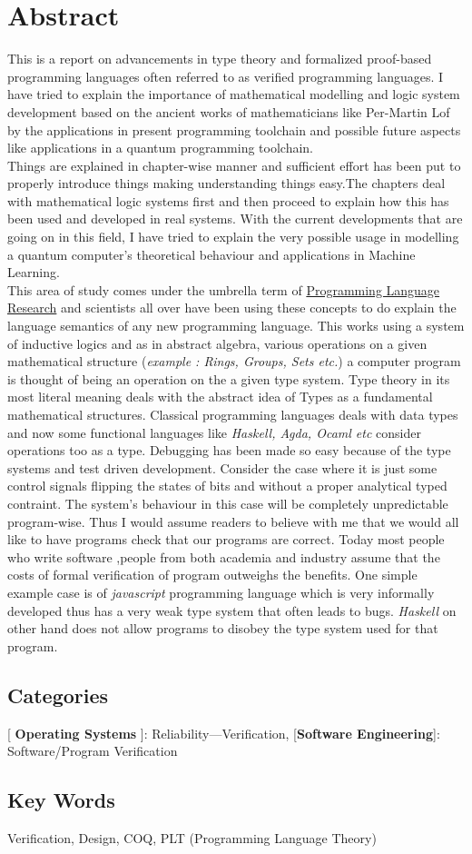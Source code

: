 \chapter*{Abstract}

This is a report on advancements in type theory and formalized proof-based programming languages often referred to as verified programming languages. I have tried to explain the importance of mathematical modelling and logic system development based on the ancient works of mathematicians like Per-Martin Lof by the applications in present programming toolchain and possible future aspects like applications in a quantum  programming toolchain.\\

Things are explained in chapter-wise manner and sufficient effort has been put to properly introduce things making understanding things easy.The chapters deal with mathematical logic systems first and then proceed to explain how this has been used and developed in real systems. With the current developments that are going on in this field, I have tried to explain the very possible usage in modelling a quantum computer's theoretical behaviour and applications in Machine Learning.\\

This area of study comes under the umbrella term of \underline{Programming Language Research} and scientists all over have been  using these concepts to do explain the language semantics of any new programming language. This works using a system of inductive logics and as in abstract algebra, various operations on a given mathematical structure (\textit{example : Rings, Groups, Sets etc.}) a computer program is thought of being an operation on the a given type system. Type theory in its most literal meaning deals with the abstract idea of Types as a fundamental mathematical structures. Classical programming languages deals with data types and now some functional languages like \textit{Haskell, Agda, Ocaml etc} consider operations too as a type. Debugging has been made so easy because of the type systems and test driven development. Consider the case where it is just some control signals flipping the states of bits and without a proper analytical typed contraint. The system's behaviour in this case will be completely unpredictable program-wise. Thus I would assume readers to believe with me that we would all like to have programs check that our programs are correct. Today most people who write software ,people from both academia and industry assume that the costs of formal verification of program outweighs the benefits. One simple example case is of \textit{javascript} programming language which is very informally developed thus has a very weak type system that often leads to bugs.  \textit{Haskell} on other hand does not allow programs to disobey the type system used for that program.


\section*{Categories}
[ \textbf{Operating Systems} ]:  Reliability—Verification, [\textbf{Software Engineering}]: Software/Program Verification

\section*{Key Words}
Verification, Design, COQ, PLT (Programming Language Theory)


